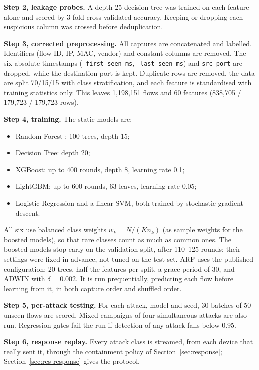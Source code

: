 \documentclass[preprint,12pt]{elsarticle}
\newcommand{\col}[1]{\texttt{\small #1}}
\begin{document}
\textbf{Step 2, leakage probes.} A depth-25 decision tree was trained on each feature alone and scored by 3-fold cross-validated accuracy. Keeping or dropping each suspicious column was crossed before deduplication.

\textbf{Step 3, corrected preprocessing.} All captures are concatenated and labelled. Identifiers (flow ID, IP, MAC, vendor) and constant columns are removed. The six absolute timestamps (\col{*\_\allowbreak{}first\_\allowbreak{}seen\_\allowbreak{}ms}, \col{*\_\allowbreak{}last\_\allowbreak{}seen\_\allowbreak{}ms}) and \col{src\_\allowbreak{}port} are dropped, while the destination port is kept. Duplicate rows are removed, the data are split 70/15/15 with class stratification, and each feature is standardised with training statistics only. This leaves 1,198,151 flows and 60 features (838,705 / 179,723 / 179,723 rows).

\textbf{Step 4, training.} The static models are:
\begin{itemize}
    \item Random Forest \cite{b16}: 100 trees, depth 15;
    \item Decision Tree: depth 20;
    \item XGBoost: up to 400 rounds, depth 8, learning rate 0.1;
    \item LightGBM: up to 600 rounds, 63 leaves, learning rate 0.05;
    \item Logistic Regression and a linear SVM, both trained by stochastic gradient descent.
\end{itemize}
All six use balanced class weights $w_k = N/(K n_k)$ (as sample weights for the boosted models), so that rare classes count as much as common ones. The boosted models stop early on the validation split, after 110--125 rounds; their settings were fixed in advance, not tuned on the test set. ARF uses the published configuration: 20 trees, half the features per split, a grace period of 30, and ADWIN with $\delta = 0.002$. It is run prequentially, predicting each flow before learning from it, in both capture order and shuffled order.

\textbf{Step 5, per-attack testing.} For each attack, model and seed, 30 batches of 50 unseen flows are scored. Mixed campaigns of four simultaneous attacks are also run. Regression gates fail the run if detection of any attack falls below 0.95.

\textbf{Step 6, response replay.} Every attack class is streamed, from each device that really sent it, through the containment policy of Section~\ref{sec:response}; Section~\ref{sec:res-response} gives the protocol.
\end{document}
